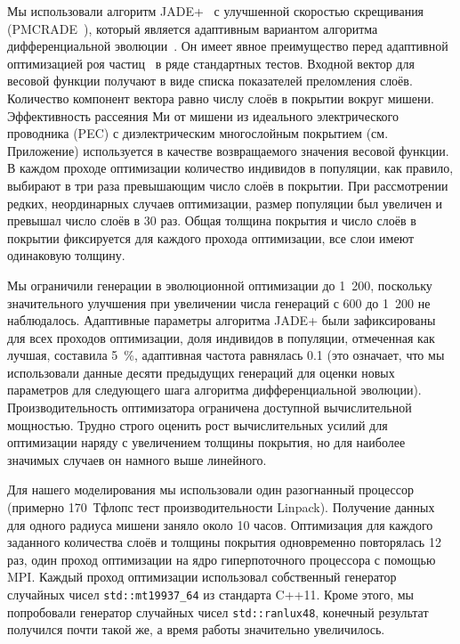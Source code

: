 Мы использовали алгоритм JADE+~\cite{Jingqiao-JADE-2009} с улучшенной
скоростью скрещивания (PMCRADE~\cite{Jie-PMCRADE-2011}), который
является адаптивным вариантом алгоритма дифференциальной
эволюции~\cite{Storn-DE-first-1997}. Он имеет явное преимущество перед
адаптивной оптимизацией роя частиц~\cite{Zhan-APSO-2009} в ряде
стандартных тестов.  Входной вектор для весовой функции получают в
виде списка показателей преломления слоёв. Количество компонент
вектора равно числу слоёв в покрытии вокруг мишени. Эффективность
рассеяния Ми от мишени из идеального электрического проводника (PEC) с
диэлектрическим многослойным покрытием (см. Приложение) используется в
качестве возвращаемого значения весовой функции. В каждом проходе
оптимизации количество индивидов в популяции, как правило, выбирают в
три раза превышающим число слоёв в покрытии. При рассмотрении редких,
неординарных случаев оптимизации, размер популяции был увеличен и
превышал число слоёв в 30 раз. Общая толщина покрытия и число слоёв в
покрытии фиксируется для каждого прохода оптимизации, все слои имеют
одинаковую толщину.
 

Мы ограничили генерации в эволюционной оптимизации до 1~200, поскольку
значительного улучшения при увеличении числа генераций с 600 до 1~200
не наблюдалось. Адаптивные параметры алгоритма JADE+ были
зафиксированы для всех проходов оптимизации, доля индивидов в
популяции, отмеченная как лучшая, составила 5~\%, адаптивная частота
равнялась 0.1 (это означает, что мы использовали данные десяти
предыдущих генераций для оценки новых параметров для следующего шага
алгоритма дифференциальной эволюции).  Производительность оптимизатора
ограничена доступной вычислительной мощностью. Трудно строго оценить
рост вычислительных усилий для оптимизации наряду с увеличением
толщины покрытия, но для наиболее значимых случаев он намного выше
линейного.

Для нашего моделирования мы использовали один разогнанный процессор
(примерно 170~Тфлопс тест производительности Linpack). Получение
данных для одного радиуса мишени заняло около 10 часов. Оптимизация
для каждого заданного количества слоёв и толщины покрытия одновременно
повторялась 12 раз, один проход оптимизации на ядро гиперпоточного
процессора с помощью MPI. Каждый проход оптимизации использовал
собственный генератор случайных чисел \verb+std::mt19937_64+ из
стандарта C++11. Кроме этого, мы попробовали генератор случайных чисел
\verb+std::ranlux48+, конечный результат получился почти такой же, а
время работы значительно увеличилось.

